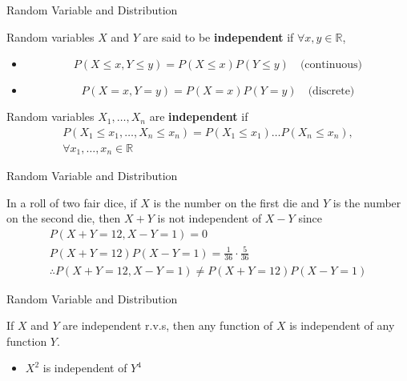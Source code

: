 \documentclass{beamer}
\newcommand{\mbb}[1]{\mathbb{#1}}
\newcommand{\tb}[1]{\textbf{#1}}
\begin{document}
\begin{frame}{Random Variable and Distribution}
    \begin{definition}
        Random variables $X$ and $Y$ are said to be \tb{independent} if
        $\forall x, y \in \mbb{R}$,
        \begin{itemize}
            \item{
                \[
                    P(X \leq x, Y \leq y) = P(X \leq x)P(Y \leq y) \quad \text{(continuous)}
                    \] 
            }
            \item{
                \[
                    P(X=x,Y=y) = P(X=x)P(Y=y) \quad \text{(discrete)}
                \]
            }
        \end{itemize}
    \end{definition}
    \begin{definition}
        Random variables $X_1,\dots, X_n$ are \tb{independent} if 
        \[
        \begin{gathered}
            P(X_1 \leq x_1, \dots, X_n \leq x_n) = P(X_1 \leq x_1)\dots P(X_n\leq x_n),\\
            \forall x_1,\dots, x_n \in \mbb{R}
        \end{gathered}
        \]
    \end{definition}
\end{frame}

\begin{frame}{Random Variable and Distribution}
    \begin{example}
        In a roll of two fair dice, if $X$ is the number on the first die and $Y$ is the number on the second die, then $X+ Y$ is not independent of $X-Y$ since 
        \[
        \begin{gathered}
            P(X+Y=12,X-Y=1) = 0\\
            P(X+Y=12)P(X-Y=1) = \frac{1}{36} \cdot \frac{5}{36}\\
            \therefore P(X+Y=12,X-Y=1)\neq P(X+Y=12)P(X-Y=1)
        \end{gathered}
        \]
    \end{example}
\end{frame}

\begin{frame}{Random Variable and Distribution}
    \begin{theorem}
        If $X$ and $Y$ are independent r.v.s, then any function of $X$ is independent of any function $Y$.
    \end{theorem}
    \begin{center}
        \begin{itemize}
        \item{
            $X^2$ is independent of $Y^4$
        }
        \end{itemize}
    \end{center}
\end{frame}
\end{document}
